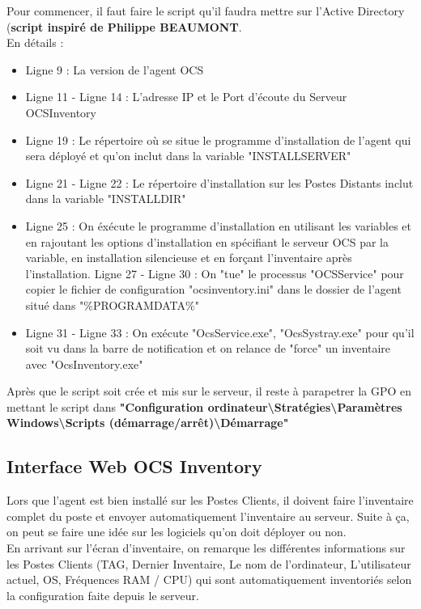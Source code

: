 \documentclass[11pt,a4paper,oneside]{article}
\begin{document}
Pour commencer, il faut faire le script qu'il faudra mettre sur l'Active Directory (\textbf{script inspiré de Philippe BEAUMONT}.\\
En détails : 
\begin{itemize}
\item Ligne 9 : La version de l'agent OCS
\item Ligne 11 - Ligne 14 : L'adresse IP et le Port d'écoute du Serveur OCSInventory
\item Ligne 19 : Le répertoire où se situe le programme d'installation de l'agent qui sera déployé et qu'on inclut dans la variable "INSTALLSERVER"
\item Ligne 21 - Ligne 22 : Le répertoire d'installation sur les Postes Distants inclut dans la variable "INSTALLDIR"
\item Ligne 25 : On éxécute le programme d'installation en utilisant les variables et en rajoutant les options d'installation en spécifiant le serveur OCS par la variable, en installation silencieuse et en forçant l'inventaire après l'installation.
Ligne 27 - Ligne 30 : On "tue" le processus "OCSService" pour copier le fichier de configuration "ocsinventory.ini" dans le dossier de l'agent situé dans "\%PROGRAMDATA\%"
\item Ligne 31 - Ligne 33 : On exécute "OcsService.exe", "OcsSystray.exe" pour qu'il soit vu dans la barre de notification et on relance de "force" un inventaire avec "OcsInventory.exe" \\
\end{itemize}
Après que le script soit crée et mis sur le serveur, il reste à parapetrer la GPO en mettant le script dans \textbf{"Configuration ordinateur\textbackslash Stratégies\textbackslash  Paramètres Windows\textbackslash  Scripts (démarrage/arrêt)\textbackslash Démarrage"}
\newpage
\subsection{Interface Web OCS Inventory}
Lors que l'agent est bien installé sur les Postes Clients, il doivent faire l'inventaire complet du poste et envoyer automatiquement l'inventaire au serveur. Suite à ça, on peut se faire une idée sur les logiciels qu'on doit déployer ou non. \\

En arrivant sur l'écran d'inventaire, on remarque les différentes informations sur les Postes Clients (TAG, Dernier Inventaire, Le nom de l'ordinateur, L'utilisateur actuel, OS, Fréquences RAM / CPU) qui sont automatiquement inventoriés selon la configuration faite depuis le serveur.
\end{document}
